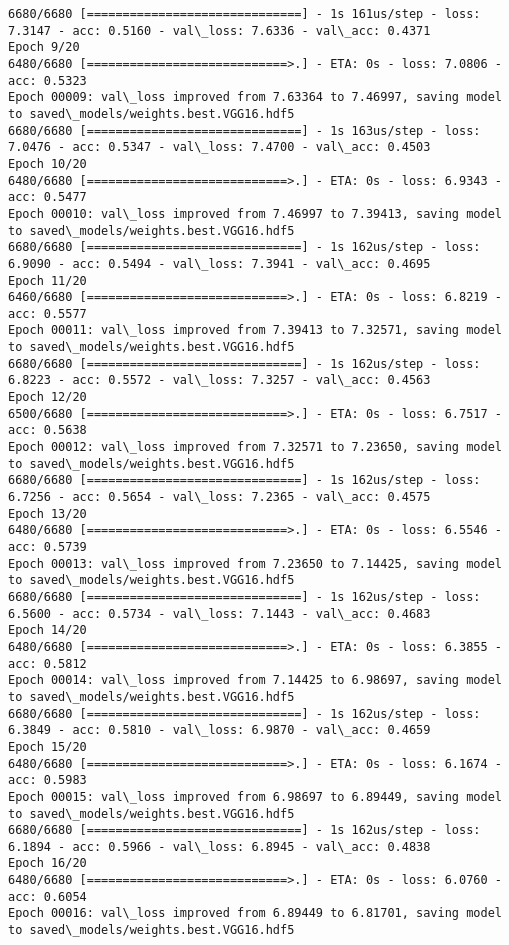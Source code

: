 \documentclass[11pt]{article}
\begin{document}
\begin{Verbatim}[commandchars=\\\{\}]
6680/6680 [==============================] - 1s 161us/step - loss: 7.3147 - acc: 0.5160 - val\_loss: 7.6336 - val\_acc: 0.4371
Epoch 9/20
6480/6680 [============================>.] - ETA: 0s - loss: 7.0806 - acc: 0.5323
Epoch 00009: val\_loss improved from 7.63364 to 7.46997, saving model to saved\_models/weights.best.VGG16.hdf5
6680/6680 [==============================] - 1s 163us/step - loss: 7.0476 - acc: 0.5347 - val\_loss: 7.4700 - val\_acc: 0.4503
Epoch 10/20
6480/6680 [============================>.] - ETA: 0s - loss: 6.9343 - acc: 0.5477
Epoch 00010: val\_loss improved from 7.46997 to 7.39413, saving model to saved\_models/weights.best.VGG16.hdf5
6680/6680 [==============================] - 1s 162us/step - loss: 6.9090 - acc: 0.5494 - val\_loss: 7.3941 - val\_acc: 0.4695
Epoch 11/20
6460/6680 [============================>.] - ETA: 0s - loss: 6.8219 - acc: 0.5577
Epoch 00011: val\_loss improved from 7.39413 to 7.32571, saving model to saved\_models/weights.best.VGG16.hdf5
6680/6680 [==============================] - 1s 162us/step - loss: 6.8223 - acc: 0.5572 - val\_loss: 7.3257 - val\_acc: 0.4563
Epoch 12/20
6500/6680 [============================>.] - ETA: 0s - loss: 6.7517 - acc: 0.5638
Epoch 00012: val\_loss improved from 7.32571 to 7.23650, saving model to saved\_models/weights.best.VGG16.hdf5
6680/6680 [==============================] - 1s 162us/step - loss: 6.7256 - acc: 0.5654 - val\_loss: 7.2365 - val\_acc: 0.4575
Epoch 13/20
6480/6680 [============================>.] - ETA: 0s - loss: 6.5546 - acc: 0.5739
Epoch 00013: val\_loss improved from 7.23650 to 7.14425, saving model to saved\_models/weights.best.VGG16.hdf5
6680/6680 [==============================] - 1s 162us/step - loss: 6.5600 - acc: 0.5734 - val\_loss: 7.1443 - val\_acc: 0.4683
Epoch 14/20
6480/6680 [============================>.] - ETA: 0s - loss: 6.3855 - acc: 0.5812
Epoch 00014: val\_loss improved from 7.14425 to 6.98697, saving model to saved\_models/weights.best.VGG16.hdf5
6680/6680 [==============================] - 1s 162us/step - loss: 6.3849 - acc: 0.5810 - val\_loss: 6.9870 - val\_acc: 0.4659
Epoch 15/20
6480/6680 [============================>.] - ETA: 0s - loss: 6.1674 - acc: 0.5983
Epoch 00015: val\_loss improved from 6.98697 to 6.89449, saving model to saved\_models/weights.best.VGG16.hdf5
6680/6680 [==============================] - 1s 162us/step - loss: 6.1894 - acc: 0.5966 - val\_loss: 6.8945 - val\_acc: 0.4838
Epoch 16/20
6480/6680 [============================>.] - ETA: 0s - loss: 6.0760 - acc: 0.6054
Epoch 00016: val\_loss improved from 6.89449 to 6.81701, saving model to saved\_models/weights.best.VGG16.hdf5

\end{Verbatim}
\end{document}
